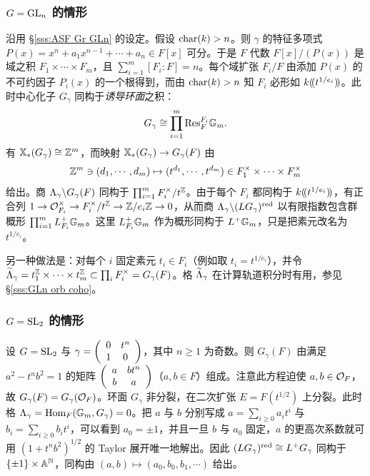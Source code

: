 \subsubsection{$G=\textup{GL}_{n}$ 的情形}\label{sss:GLn centralizer} 沿用 \S\ref{sss:ASF Gr GLn} 的设定。假设 $\textup{char}(k)>n$。则 $\gamma$ 的特征多项式 $P(x)=x^{n}+a_{1}x^{n-1}+\cdots+a_{n}\in F[x]$ 可分。于是 $F$ 代数 $F[x]/(P(x))$ 是域之积 $F_{1}\times \cdots \times F_{m}$，且 $\sum_{i=1}^{m}[F_{i}:F]=n$。每个域扩张 $F_{i}/F$ 由添加 $P(x)$ 的不可约因子 $P_{i}(x)$ 的一个根得到，而由 $\textup{char}(k)>n$ 知 $F_{i}$ 必形如 $k(\!(t^{1/e_{i}})\!)$。此时中心化子 $G_{\gamma}$ 同构于{\em 诱导环面}之积：
\begin{equation*}
G_{\gamma}\cong \prod_{i=1}^{m}\textup{Res}^{F_{i}}_{F}\mathbb{G}_m.
\end{equation*}
有 $\mathbb{X}_*(G_{\gamma})\cong \mathbb{Z}^{m}$，而映射 $\mathbb{X}_*(G_{\gamma})\to G_{\gamma}(F)$ 由
\begin{equation*}
\mathbb{Z}^{m}\ni(d_{1},\cdots, d_{m})\mapsto (t^{d_{1}},\cdots, t^{d_{m}})\in F^{\times}_{1}\times\cdots\times F^{\times}_{m}
\end{equation*}
给出。商 $\Lambda_{\gamma}\backslash G_{\gamma}(F)$ 同构于 $\prod_{i=1}^{m}F^{\times}_{i}/t^{\mathbb{Z}}$。由于每个 $F_{i}$ 都同构于 $k(\!(t^{1/e_{i}})\!)$，有正合列 $1\to \mathcal{O}^{\times}_{F_{i}}\to F^{\times}_{i}/t^{\mathbb{Z}}\to \mathbb{Z}/e_{i}\mathbb{Z}\to 0$，从而商 $\Lambda_{\gamma}\backslash (LG_{\gamma})^{\textup{red}}$ 以有限指数包含群概形 $\prod_{i=1}^{m}L^{+}_{F_{i}}\mathbb{G}_m$。这里 $L^{+}_{F_{i}}\mathbb{G}_m$ 作为概形同构于 $L^{+}\mathbb{G}_m$，只是把素元改名为 $t^{1/e_{i}}$。

另一种做法是：对每个 $i$ 固定素元 $t_{i}\in F_{i}$（例如取 $t_{i}=t^{1/e_{i}}$），并令 $\widetilde{\Lambda}_{\gamma}=t_{1}^{\mathbb{Z}}\times\cdots\times t^{\mathbb{Z}}_{m}\subset \prod_{i}F_{i}^{\times}=G_{\gamma}(F)$。格 $\widetilde{\Lambda}_{\gamma}$ 在计算轨道积分时有用，参见 \S\ref{sss:GLn orb coho}。

\subsubsection{$G=\textup{SL}_{2}$ 的情形} 设 $G=\textup{SL}_{2}$ 与 $\gamma=\left(\begin{array}{cc} 0 & t^{n} \\ 1 & 0 \end{array}\right)$，其中 $n\geq 1$ 为奇数。则 $G_{\gamma}(F)$ 由满足 $a^{2}-t^{n}b^{2}=1$ 的矩阵 $\left(\begin{array}{cc} a & bt^{n} \\ b & a \end{array}\right)$（$a,b\in F$）组成。注意此方程迫使 $a,b\in\mathcal{O}_{F}$，故 $G_{\gamma}(F)=G_{\gamma}(\mathcal{O}_{F})$。环面 $G_{\gamma}$ 非分裂，在二次扩张 $E=F(t^{1/2})$ 上分裂。此时格 $\Lambda_{\gamma}=\textup{Hom}_{F}(\mathbb{G}_m,G_{\gamma})=0$。把 $a$ 与 $b$ 分别写成 $a=\sum_{i\geq0}a_{i}t^{i}$ 与 $b_{i}=\sum_{i\geq 0}b_{i}t^{i}$，可以看到 $a_{0}=\pm1$，并且一旦 $b$ 与 $a_{0}$ 固定，$a$ 的更高次系数就可用 $(1+t^{n}b^{2})^{1/2}$ 的 Taylor 展开唯一地解出。因此 $(LG_{\gamma})^{\textup{red}}\cong L^{+}G_{\gamma}$ 同构于 $\{\pm1\}\times \mathbb{A}^{\mathbb{N}}$，同构由 $(a,b)\mapsto (a_{0},b_{0},b_{1},\cdots)$ 给出。

